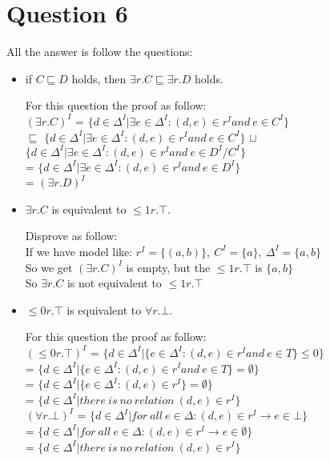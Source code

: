 \documentclass{article}
\begin{document}
	

	\section{Question 6}

	All the answer is follow the questions:

	\begin{itemize}
		\item if $C\sqsubseteq D$ holds, then $\exists r.C\sqsubseteq\exists r.D$ holds.
		
		For this question the proof as follow:\\
		$(\exists r.C)^I$ = $\{d \in \Delta^I | \exists e \in \Delta^I :(d,e) \in r^I and \ e \in C^I\}$\\
		$\sqsubseteq$ $\{d \in \Delta^I | \exists e \in \Delta^I :(d,e) \in r^I and \ e \in C^I\}$ $\sqcup$  $\{d \in \Delta^I | \exists e \in \Delta^I :(d,e) \in r^I and \ e \in D^I / C^I\}$ \\
		= $\{d \in \Delta^I | \exists e \in \Delta^I :(d,e) \in r^I and \ e \in D^I\}$\\
		= $(\exists r.D)^I$

		\item $\exists r.C$ is equivalent to $\leq{1}{r}.\top$.
		
		Disprove as follow:\\
		If we have model like: $r^I = \{(a,b)\},\ C^I = \{a\},\ \Delta^I = \{a,b\} $\\
		So we get $(\exists r.C)^I$ is empty, but the $\leq{1}{r}.\top$ is $\{a,b\}$\\
		So $\exists r.C$ is not equivalent to $\leq{1}{r}.\top$
		
		\item $\leq{0}{r}.\top$ is equivalent to $\forall r.\bot$.
		
		For this question the proof as follow:\\
		$(\leq{0}{r}.\top)^I$ = $\{d \in \Delta^I | \{e \in \Delta^I :(d,e) \in r^I and \ e \in T\} \leq 0 \}$\\
		= $\{d \in \Delta^I | \{e \in \Delta^I :(d,e) \in r^I and \ e \in T\} = \emptyset \}$\\
		= $\{d \in \Delta^I | \{e \in \Delta^I :(d,e) \in r^I \} = \emptyset \}$\\
		= $\{d \in \Delta^I | there \ is \ no \ relation \ (d,e) \in r^I \}$\\

		$(\forall r.\bot)^I$ = $\{d \in \Delta^I | for \ all \ e \in \Delta: (d,e) \in r^I \rightarrow e \in \bot \}$\\
		= $\{d \in \Delta^I | for \ all \ e \in \Delta: (d,e) \in r^I \rightarrow e \in \emptyset \}$\\
		= $\{d \in \Delta^I | there \ is \ no \ relation \ (d,e) \in r^I \}$\\


\end{itemize}
\end{document}

